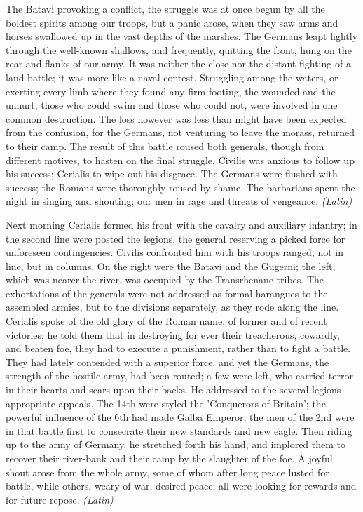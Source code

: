 
The Batavi provoking a conflict, the struggle was at once begun by all the boldest spirits among our troops, but a panic arose, when they saw arms and horses swallowed up in the vast depths of the marshes. The Germans leapt lightly through the well-known shallows, and frequently, quitting the front, hung on the rear and flanks of our army. It was neither the close nor the distant fighting of a land-battle; it was more like a naval contest. Struggling among the waters, or exerting every limb where they found any firm footing, the wounded and the unhurt, those who could swim and those who could not, were involved in one common destruction. The loss however was less than might have been expected from the confusion, for the Germans, not venturing to leave the morass, returned to their camp. The result of this battle roused both generals, though from different motives, to hasten on the final struggle. Civilis was anxious to follow up his success; Cerialis to wipe out his disgrace. The Germans were flushed with success; the Romans were thoroughly roused by shame. The barbarians spent the night in singing and shouting; our men in rage and threats of vengeance. \emph{(Latin)}


Next morning Cerialis formed his front with the cavalry and auxiliary infantry; in the second line were posted the legions, the general reserving a picked force for unforeseen contingencies. Civilis confronted him with his troops ranged, not in line, but in columns. On the right were the Batavi and the Gugerni; the left, which was nearer the river, was occupied by the Transrhenane tribes. The exhortations of the generals were not addressed as formal harangues to the assembled armies, but to the divisions separately, as they rode along the line. Cerialis spoke of the old glory of the Roman name, of former and of recent victories; he told them that in destroying for ever their treacherous, cowardly, and beaten foe, they had to execute a punishment, rather than to fight a battle. They had lately contended with a superior force, and yet the Germans, the strength of the hostile army, had been routed; a few were left, who carried terror in their hearts and scars upon their backs. He addressed to the several legions appropriate appeals. The 14th were styled the 'Conquerors of Britain'; the powerful influence of the 6th had made Galba Emperor; the men of the 2nd were in that battle first to consecrate their new standards and new eagle. Then riding up to the army of Germany, he stretched forth his hand, and implored them to recover their river-bank and their camp by the slaughter of the foe. A joyful shout arose from the whole army, some of whom after long peace lusted for battle, while others, weary of war, desired peace; all were looking for rewards and for future repose. \emph{(Latin)}

